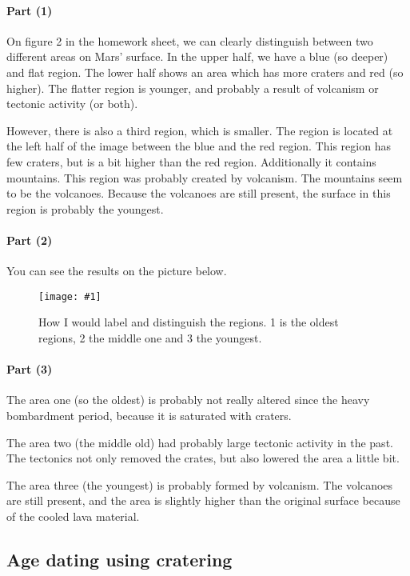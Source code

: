 \documentclass[12pt,a4paper]{article}
\newcommand*{\formatedgraphic}[3]
{
\begin{figure}[H]
	\centering
		\texttt{[image: \#1]}
	 \caption[#2]{#2. #3}
	 \label{fig:#2}
\end{figure}
}
\begin{document}
\paragraph{Part (1)}

On figure 2 in the homework sheet, we can clearly distinguish between two different areas on Mars' surface. In the upper half, we have a blue (so deeper) and flat region. The lower half shows an area which has more craters and red (so higher). The flatter region is younger, and probably a result of volcanism or tectonic activity (or both).

However, there is also a third region, which is smaller. The region is located at the left half of the image between the blue and the red region. This region has few craters, but is a bit higher than the red region. Additionally it contains mountains. This region was probably created by volcanism. The mountains seem to be the volcanoes. Because the volcanoes are still present, the surface in this region is probably the youngest.

\paragraph{Part (2)}

You can see the results on the picture below.

\formatedgraphic{marssurface.png}{How I would label and distinguish the regions. 1 is the oldest regions, 2 the middle one and 3 the youngest}{}

\paragraph{Part (3)}

The area one (so the oldest) is probably not really altered since the heavy bombardment period, because it is saturated with craters.

The area two (the middle old) had probably large tectonic activity in the past. The tectonics not only removed the crates, but also lowered the area a little bit.

The area three (the youngest) is probably formed by volcanism. The volcanoes are still present, and the area is slightly higher than the original surface because of the cooled lava material.

\subsection{Age dating using cratering}
\end{document}
